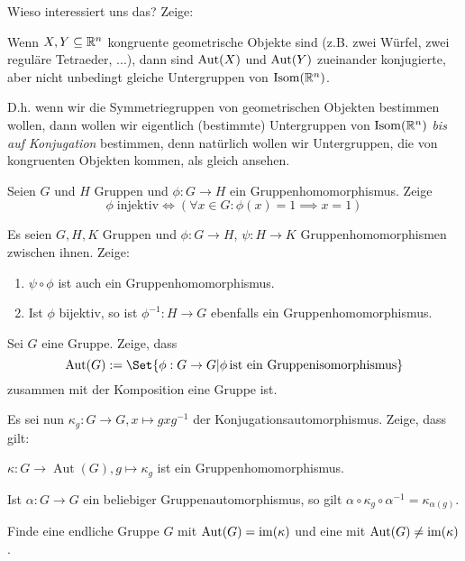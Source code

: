 \begin{sheet}
\begin{problem}[title={Operation auf Teilmengen durch Konjugation}]
Wieso interessiert uns das? Zeige:
\begin{subproblem}
Wenn $X,Y\subseteq\mathbb{R}^n$ kongruente geometrische Objekte sind (z.B. zwei Würfel, zwei reguläre Tetraeder, ...), dann sind $\operatorname{Aut}(X)$ und $\operatorname{Aut}(Y)$ zueinander konjugierte, aber nicht unbedingt gleiche Untergruppen von $\operatorname{Isom}(\mathbb{R}^n)$.
\end{subproblem}
D.h. wenn wir die Symmetriegruppen von geometrischen Objekten bestimmen wollen, dann wollen wir eigentlich (bestimmte) Untergruppen von $\operatorname{Isom}(\mathbb{R}^n)$ \emph{bis auf Konjugation} bestimmen, denn natürlich wollen wir Untergruppen, die von kongruenten Objekten kommen, als gleich ansehen.
\end{problem}


\begin{problem}[title={Injektiv = trivialer Kern}]
Seien $G$ und $H$ Gruppen und $\phi:G\to H$ ein Gruppenhomomorphismus. Zeige
\[\phi\;\text{injektiv} \iff (\forall x\in G: \phi(x)=1 \implies x=1)\]
\end{problem}

\begin{problem}
Es seien $G,H,K$ Gruppen und $\phi: G\to H$, $\psi: H\to K$ Gruppenhomomorphismen zwischen ihnen. Zeige:

\begin{enumerate}
\item $\psi\circ\phi$ ist auch ein Gruppenhomomorphismus.
\item Ist $\phi$ bijektiv, so ist $\phi^{-1}:H\to G$ ebenfalls ein Gruppenhomomorphismus.
\end{enumerate}
\end{problem}

\begin{problem}
Sei $G$ eine Gruppe. Zeige, dass
\[\operatorname{Aut}(G) := \Set{\phi: G\to G | \phi\,\text{ist ein Gruppenisomorphismus}}\]
zusammen mit der Komposition eine Gruppe ist.

Es sei nun $\kappa_g: G\to G, x\mapsto gxg^{-1}$ der Konjugationsautomorphismus. Zeige, dass gilt:
\begin{subproblem}
$\kappa: G\to\operatorname{Aut}(G), g\mapsto\kappa_g$ ist ein Gruppenhomomorphismus.
\end{subproblem}
\begin{subproblem}
Ist $\alpha: G\to G$ ein beliebiger Gruppenautomorphismus, so gilt $\alpha\circ\kappa_g\circ\alpha^{-1} = \kappa_{\alpha(g)}$.
\end{subproblem}
\begin{subproblem}
Finde eine endliche Gruppe $G$ mit $\operatorname{Aut}(G)=\operatorname{im}(\kappa)$ und eine mit $\operatorname{Aut}(G)\neq\operatorname{im}(\kappa)$.
\end{subproblem}
\end{problem}


\end{sheet}

